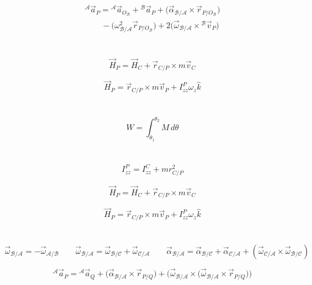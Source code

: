 \documentclass{article}
\begin{document}
\begin{multicols}{2}[\raggedcolumns]
\[
\begin{split}
    {}^\mathcal A\vec a_P={}^\mathcal A\vec a_{O_\mathcal B}+{}^\mathcal B\vec a_P+\bigl(\vec\alpha_{\mathcal B/\mathcal A}\times\vec r_{P/O_\mathcal B}\bigr) \\
    \qquad-\bigl(\omega_{\mathcal B/\mathcal A}^2\vec r_{P/O_\mathcal B}\bigr)+2\bigl(\vec\omega_{\mathcal B/\mathcal A}\times{}^\mathcal B\vec v_P\bigr)
\end{split}
\]

\section*{}
\[
\vec H_P=\vec H_C+\vec r_{C/P}\times m\vec v_C
\]

\[
\vec H_P=\vec r_{C/P}\times m\vec v_P+I_{zz}^P\omega_z\hat k
\]

\section*{}

\[
W=\int_{\theta_1}^{\theta_2}M\,d\theta
\]

\section*{}
\[
I_{zz}^P=I_{zz}^C+mr_{C/P}^2
\]

\[
\vec H_P=\vec H_C+\vec r_{C/P}\times m\vec v_C
\]

\[
\vec H_P=\vec r_{C/P}\times m\vec v_P+I_{zz}^P\omega_z\hat k
\]

\end{multicols}

\section*{}

\[
\vec\omega_{\mathcal B/\mathcal A}=-\vec\omega_{\mathcal A/\mathcal B} \qquad
\vec\omega_{\mathcal B/\mathcal A}=\vec\omega_{\mathcal B/\mathcal C}+\vec\omega_{\mathcal C/\mathcal A} \qquad
\vec\alpha_{\mathcal B/\mathcal A}=\vec\alpha_{\mathcal B/\mathcal C}+\vec\alpha_{\mathcal C/\mathcal A}+(\vec\omega_{\mathcal C/\mathcal A}\times\vec\omega_{\mathcal B/\mathcal C})
\]

\[
{}^\mathcal A\vec a_P={}^\mathcal A\vec a_Q+\bigl(\vec\alpha_{\mathcal B/\mathcal A}\times\vec r_{P/Q}\bigr)+\bigl(\vec\omega_{\mathcal B/\mathcal A}\times\bigl(\vec\omega_{\mathcal B/\mathcal A}\times\vec r_{P/Q}\bigr)\bigr)
\]
\end{document}
